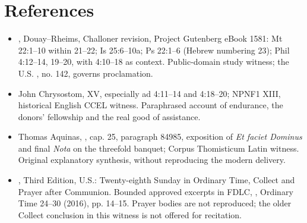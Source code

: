 \section{References}
\begin{itemize}
\item {}, Douay--Rheims, Challoner revision, Project Gutenberg eBook 1581: Mt 22:1--10 within 21--22; Is 25:6--10a; Ps 22:1--6 (Hebrew numbering 23); Phil 4:12--14, 19--20, with 4:10--18 as context. Public-domain study witness; the U.S. , no. 142, governs proclamation.
\item John Chrysostom,  XV, especially ad 4:11--14 and 4:18--20; NPNF1 XIII, historical English CCEL witness. Paraphrased account of endurance, the donors' fellowship and the real good of assistance.
\item Thomas Aquinas, , cap. 25, paragraph 84985, exposition of \textit{Et faciet Dominus} and final \textit{Nota} on the threefold banquet; Corpus Thomisticum Latin witness. Original explanatory synthesis, without reproducing the modern delivery.
\item {}, Third Edition, U.S.: Twenty-eighth Sunday in Ordinary Time, Collect and Prayer after Communion. Bounded approved excerpts in FDLC, , Ordinary Time 24--30 (2016), pp. 14--15. Prayer bodies are not reproduced; the older Collect conclusion in this witness is not offered for recitation.
\end{itemize}
